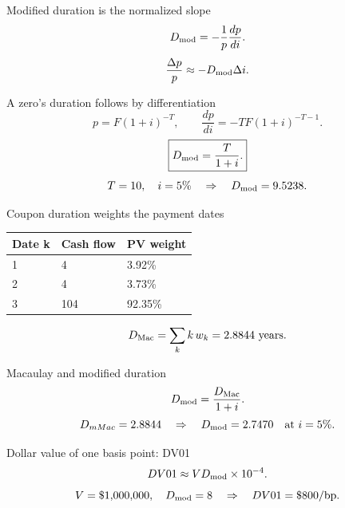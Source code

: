 \documentclass[12pt,aspectratio=169]{beamer}
\begin{document}

\begin{frame}{Modified duration is the normalized slope}
\[D_{\rm mod}=-\frac1p\frac{dp}{di}.\]\[\frac{\Delta p}{p}\approx-D_{\rm mod}\Delta i.\]
\end{frame}


\begin{frame}{A zero’s duration follows by differentiation}
\[p=F(1+i)^{-T},\qquad \frac{dp}{di}=-TF(1+i)^{-T-1}.\]\[\boxed{D_{\rm mod}=\frac{T}{1+i}.}\]\[T=10,\quad i=5\%\quad\Rightarrow\quad D_{\rm mod}=9.5238.\]
\end{frame}


\begin{frame}{Coupon duration weights the payment dates}
\begin{center}\begin{tabular}{@{}lll@{}}\toprule \textbf{Date k} & \textbf{Cash flow} & \textbf{PV weight}\\\midrule 1 & 4 & 3.92\%\\[2mm]
2 & 4 & 3.73\%\\[2mm]
3 & 104 & 92.35\%\\\bottomrule\end{tabular}\end{center}\[D_{\rm Mac}=\sum_k k\,w_k=2.8844\text{ years}.\]
\end{frame}


\begin{frame}{Macaulay and modified duration}
\[D_{\rm mod}=\frac{D_{\rm Mac}}{1+i}.\]\[D_{
m Mac}=2.8844\quad\Rightarrow\quad D_{\rm mod}=2.7470\quad\text{at }i=5\%.\]
\end{frame}


\begin{frame}{Dollar value of one basis point: DV01}
\[DV01\approx V D_{\rm mod}\times10^{-4}.\]\[V=\$1{,}000{,}000,\quad D_{\rm mod}=8\quad\Rightarrow\quad DV01=\$800/\mathrm{bp}.\]
\end{frame}
\end{document}
